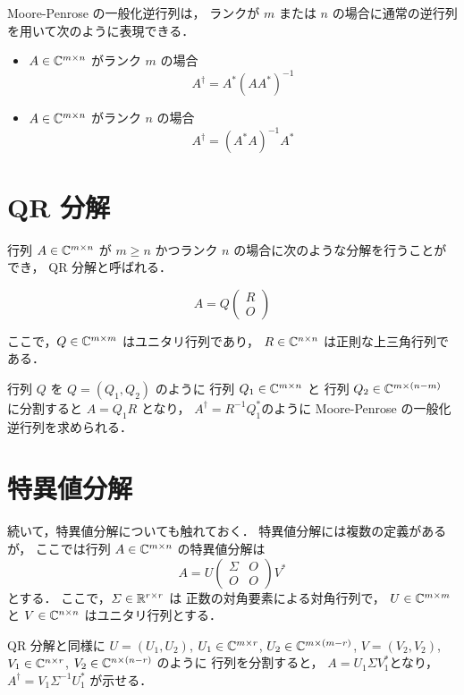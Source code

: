 Moore-Penrose の一般化逆行列は，
ランクが $m$ または $n$ の場合に通常の逆行列を用いて次のように表現できる．

\begin{itemize}
    \item $A \in \mathbb{C}^{m \times n}$ がランク $m$ の場合
          \begin{equation}
              A^\dagger = A^* (A A^*)^{-1}
          \end{equation}
    \item $A \in \mathbb{C}^{m \times n}$ がランク $n$ の場合
          \begin{equation}
              A^\dagger = (A^* A)^{-1} A^*
          \end{equation}
\end{itemize}

\section{QR 分解}

行列 $A \in \mathbb{C}^{m \times n}$ が
$m \ge n$ かつランク $n$ の場合に次のような分解を行うことができ，
QR 分解と呼ばれる．

\begin{equation}
    A = Q
    \begin{pmatrix}
        R \\ O
    \end{pmatrix}
\end{equation}

ここで，$Q \in \mathbb{C}^{m \times m}$ はユニタリ行列であり，
$R \in \mathbb{C}^{n \times n}$ は正則な上三角行列である．

行列 $Q$ を $Q = (Q_1, Q_2)$ のように
行列 $Q_1 \in \mathbb{C}^{m \times n}$ と
行列 $Q_2 \in \mathbb{C}^{m \times (n-m)}$ に分割すると
$A = Q_1 R$ となり，
$A^\dagger = R^{-1} Q_1^*$のように
Moore-Penrose の一般化逆行列を求められる．

\section{特異値分解}

続いて，特異値分解についても触れておく．
特異値分解には複数の定義があるが，
ここでは行列 $A \in \mathbb{C}^{m \times n}$ の特異値分解は
\begin{equation}
    A = U
    \begin{pmatrix}
        \Sigma & O \\
        O      & O
    \end{pmatrix}
    V^*
\end{equation}
とする．
ここで，$\varSigma \in \mathbb{R}^{r \times r}$ は
正数の対角要素による対角行列で，
$U \in \mathbb{C}^{m \times m}$ と
$V \in \mathbb{C}^{n \times n}$ はユニタリ行列とする．

QR 分解と同様に
$U = (U_1, U_2)$,
$U_1 \in \mathbb{C}^{m \times r}$,
$U_2 \in \mathbb{C}^{m \times (m-r)}$,
$V = (V_2, V_2)$,
$V_1 \in \mathbb{C}^{n \times r}$,
$V_2 \in \mathbb{C}^{n \times (n-r)}$ のように
行列を分割すると，
$A = U_1 \Sigma V_1^*$となり，
$A^\dagger = V_1 \Sigma^{-1} U_1^*$ が示せる．
